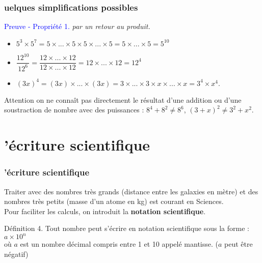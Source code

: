 \documentclass{beamer}
\begin{document}
\begin{frame}
  \frametitle{uelques simplifications possibles}

  \begin{block}{\textcolor{blue}{Preuve - Propriété 1.}}
  \textit{par un retour au produit.}
  
  \begin{itemize}
  \item $5^3 \times 5^7 = 5 \times ... \times 5 \times  5 \times ... \times 5 =  5 \times ... \times 5 = 5^{10}$
  \item $\dfrac{12^{10}}{12^{6}} = \dfrac{12 \times ... \times 12}{12 \times ... \times 12} =12 \times ... \times 12 = 12^4$
  \item $(3 x)^4 = (3x) \times ... \times (3x) = 3 \times ... \times 3 \times x \times ... \times x = 3^4 \times x^4.$
  \end{itemize}

  \begin{exampleblock}{Attention}
on ne connaît pas directement le résultat d'une addition ou d'une soustraction de nombre avec des puissances : $8^4 + 8^2 \neq 8^6$, $(3 + x)^2 \neq 3^2 + x^2 $.

  \end{exampleblock}

  \end{block}
\end{frame}


\section{'écriture scientifique}


\begin{frame}
  \frametitle{'écriture scientifique}

Traiter avec des nombres très grands (distance entre les galaxies en mètre) et des nombres très petits (masse d'un atome en kg) est courant en Sciences. \\
Pour faciliter les calculs, on introduit la \textbf{notation scientifique}.

 \begin{alertblock}{Définition 4.}
	Tout nombre peut s'écrire en notation scientifique sous la forme : $ \boxed{ a \times 10^n} $\\
  où $a$ est un nombre décimal compris entre 1 et 10 appelé mantisse. ($a$ peut être négatif)

  \end{alertblock}

\end{frame}
\end{document}
